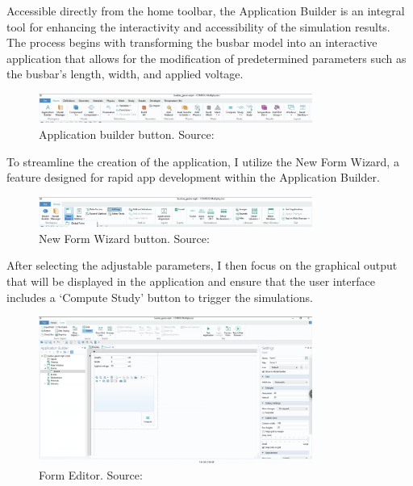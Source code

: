 Accessible directly from the home toolbar, the Application Builder is an integral tool for enhancing the interactivity and accessibility of the simulation results. The process begins with transforming the busbar model into an interactive application that allows for the modification of predetermined parameters such as the busbar's length, width, and applied voltage.

\begin{figure}[H]
    \centering
    \includegraphics[width=0.8\textwidth]{Chapters/Figures/Chapter 3 Figures/Application Builder Button.png}
    \caption{Application builder button. Source: \cite{multiphysics__modeling_nodate}}
    \label{fig:application builder button}
\end{figure}

To streamline the creation of the application, I utilize the New Form Wizard, a feature designed for rapid app development within the Application Builder.

\begin{figure}[H]
    \centering
    \includegraphics[width=0.8\textwidth]{Chapters/Figures/Chapter 3 Figures/New Form Wizard Button.png}
    \caption{New Form Wizard button. Source: \cite{multiphysics__modeling_nodate}}
    \label{fig:New Form Wizard button}
\end{figure}

After selecting the adjustable parameters, I then focus on the graphical output that will be displayed in the application and ensure that the user interface includes a `Compute Study' button to trigger the simulations.

\begin{figure}[H]
    \centering
    \includegraphics[width=0.8\textwidth]{Chapters/Figures/Chapter 3 Figures/Form Editor Desktop.png}
    \caption{Form Editor. Source: \cite{multiphysics__modeling_nodate}}
    \label{fig:Form Editor}
\end{figure}


